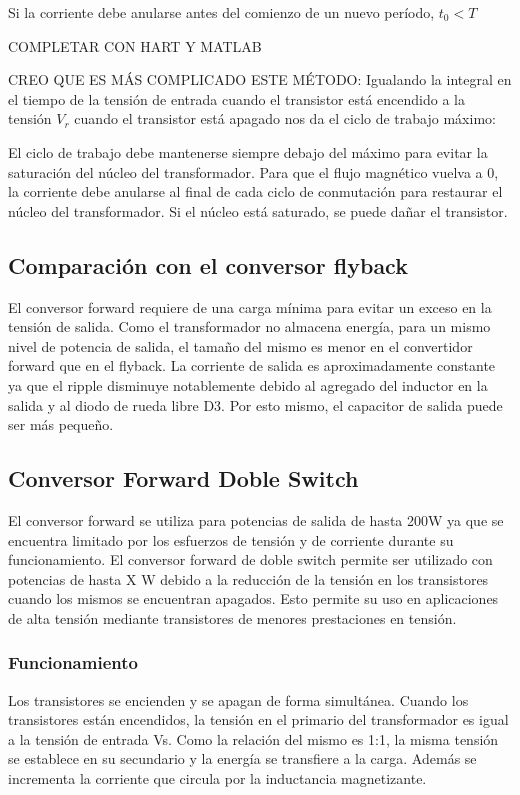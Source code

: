 Si la corriente debe anularse antes del comienzo de un nuevo período, 
$t_0<T$

COMPLETAR CON HART Y MATLAB

CREO QUE ES MÁS COMPLICADO ESTE MÉTODO:
Igualando la integral en el tiempo de la tensión de entrada cuando el transistor está encendido a la tensión $V_r$ cuando el transistor está apagado nos da el ciclo de trabajo máximo:


El ciclo de trabajo debe mantenerse siempre debajo del máximo para evitar la saturación del núcleo del transformador. 
Para que el flujo magnético vuelva a 0, la corriente debe anularse
 al final de cada ciclo de conmutación para restaurar el núcleo del transformador. 
Si el núcleo está saturado, se puede dañar el transistor. 

\subsection{Comparación con el conversor flyback}

El conversor forward requiere de una carga mínima para evitar un exceso en la tensión de salida. 
Como el transformador no almacena energía, para un mismo nivel de potencia de salida, 
el tamaño del mismo es menor en el convertidor forward que en el flyback. 
La corriente de salida es aproximadamente constante ya que el ripple disminuye notablemente 
debido al agregado del inductor en la salida y al diodo de rueda libre D3.
Por esto mismo, el capacitor de salida puede ser más pequeño. 


\subsection{Conversor Forward Doble Switch}

El conversor forward se utiliza para potencias de salida de hasta 200W ya que se encuentra limitado 
por los esfuerzos de tensión y de corriente durante su funcionamiento. 
El conversor forward de doble switch permite ser utilizado con potencias de hasta X W debido a la 
reducción de la tensión en los transistores cuando los mismos se encuentran apagados. 
Esto permite su uso en aplicaciones de alta tensión mediante transistores de menores prestaciones en tensión. 

\subsubsection{Funcionamiento}

Los transistores se encienden y se apagan de forma simultánea. 
Cuando los transistores están encendidos, la tensión en el primario del transformador es igual a la tensión de entrada Vs. 
Como la relación del mismo es 1:1, la misma tensión se establece en su secundario y la energía se transfiere a la carga. 
Además se incrementa la corriente que circula por la inductancia magnetizante. 

